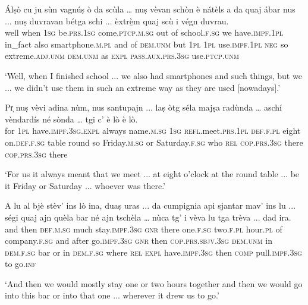 \begin{linenumbers}
	\gll  Álṣò cu ju sùn vagnúṣ ò da scùla … nuṣ vèvan schòn è nátèls a da quaj ábar nus ... nuṣ duvravan bétga schi ... èxtrè̱m quaj scù i végn duvrau.  \\
well when \textsc{1sg} be.\textsc{prs.1sg} come.\textsc{ptcp.m.sg} out of school.\textsc{f.sg} {} we have.\textsc{impf.1pl} in\_fact also smartphone.\textsc{m.pl} and of \textsc{dem.unm} but \textsc{1pl} {} \textsc{1pl} use.\textsc{impf.1pl} \textsc{neg} so {} extreme.\textsc{adj.unm} \textsc{dem.unm} as \textsc{expl} \textsc{pass.aux.prs.3sg} use.\textsc{ptcp.unm}\\
\end{linenumbers}
\medskip
\glt `Well, when I finished school ... we also had smartphones and such things, but we ... we didn't use them in such an extreme way as they are used [nowadays].'
\medskip

\begin{linenumbers}
	\gll Pr̩ nuṣ vèvi adina nùm, nus santupajn ... laṣ òtg séla majṣa radùnda … aschí vèndardís né sònda … tgi c’ è lò è lò.   \\
for \textsc{1pl} have.\textsc{impf.3sg.expl} always name.\textsc{m.sg} \textsc{1sg} \textsc{refl}.meet.\textsc{prs.1pl} {} \textsc{def.f.pl} eight on.\textsc{def.f.sg} table round {} so Friday.\textsc{m.sg} or Saturday.\textsc{f.sg} {} who \textsc{rel} \textsc{cop.prs.3sg} there \textsc{cop.prs.3sg} there	\\
\end{linenumbers}
\medskip
\glt `For us it always meant that we meet ... at eight o'clock at the round table ... be it Friday or Saturday ... whoever was there.'
\medskip

\begin{linenumbers}
	\gll  A lu al bjè stèv’ ins lò ina, duaṣ uras ... da cumpignia api sjantar mav’ ins lu ... ségi quaj ajn quèla bar né ajn tschèla … nùca tg’ i vèva lu tga trèva ... dad ira.  \\
	and then \textsc{def.m.sg} much stay.\textsc{impf.3sg} \textsc{gnr} there one.\textsc{f.sg} two.\textsc{f.pl} hour.\textsc{pl} {} of company.\textsc{f.sg} and after go.\textsc{impf.3sg} \textsc{gnr} then {} \textsc{cop.prs.sbjv.3sg} \textsc{dem.unm} in \textsc{dem.f.sg} bar or in \textsc{dem.f.sg} {} where \textsc{rel} \textsc{expl} have.\textsc{impf.3sg} then \textsc{comp} pull.\textsc{impf.3sg} {} to go.\textsc{inf}\\
\end{linenumbers}
\medskip
\glt `And then we would mostly stay one or two hours together and then we would go into this bar or into that one ... wherever it drew us to go.'
\medskip

